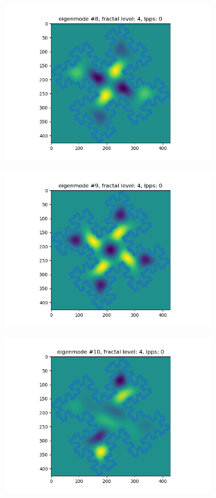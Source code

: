 \documentclass{article}
\begin{document}
\begin{figure}
\begin{subfigure}{0.3\textwidth}
        \includegraphics[width=\linewidth]{../figs/eigenmode_2d8.png}
    \end{subfigure}
    \begin{subfigure}{0.3\textwidth}
        \includegraphics[width=\linewidth]{../figs/eigenmode_2d9.png}
    \end{subfigure}
    \begin{subfigure}{0.3\textwidth}
        \includegraphics[width=\linewidth]{../figs/eigenmode_2d10.png}

\end{subfigure}
\end{figure}
\end{document}
